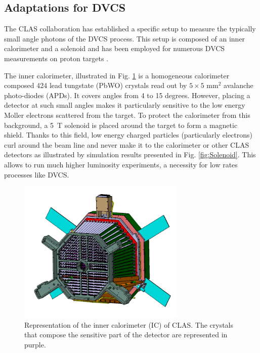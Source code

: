 \documentclass{article}
\begin{document}
\subsection{Adaptations for DVCS}

The CLAS collaboration has established a specific setup to measure the typically 
small angle photons of the DVCS process. This setup is composed of an inner 
calorimeter and a solenoid and has been employed for numerous DVCS measurements on proton 
targets \cite{Seder:2014cdc,Jo:2015ema,HirlingerSaylor:2018bnu}.

The inner calorimeter, illustrated in Fig. \ref{fig:IC} is a homogeneous 
calorimeter composed 424 lead tungstate 
(PbWO) crystals read out by $5 \times 5$ mm$^2$ avalanche photo-diodes (APDs). 
It covers angles from 4 to 15 degrees. However, placing a detector at such small angles makes it 
particularly sensitive to the low energy Moller electrons scattered from the target.
To protect the calorimeter from this background, a 5~T solenoid is 
placed around the target to form
a magnetic shield. Thanks to this field, low energy charged particles (particularly 
electrons) curl around the beam line 
and never make it to the calorimeter or other CLAS detectors as illustrated 
by simulation results presented 
in Fig. \ref{fig:Solenoid}. This allows to run much higher luminosity experiments,
a necessity for low rates processes like DVCS.

\begin{figure}[tbp!]
\center
\includegraphics[width=8cm]{fig3/IC-CLAS.png}
	\caption{Representation of the inner calorimeter (IC) of CLAS. The crystals that compose the
	sensitive part of the detector are represented in purple.}
\label{fig:IC}
\end{figure}
\end{document}
